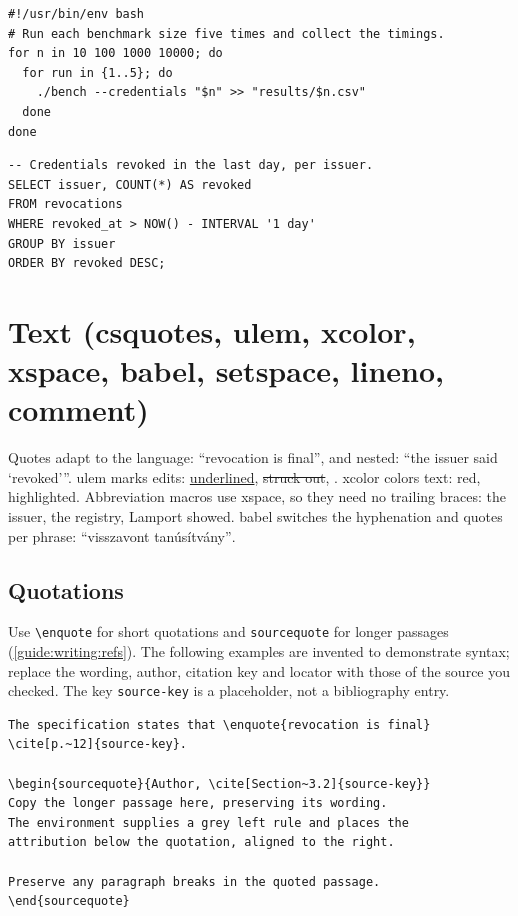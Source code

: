 \begin{listing}[!ht]
\begin{verbatim}
#!/usr/bin/env bash
# Run each benchmark size five times and collect the timings.
for n in 10 100 1000 10000; do
  for run in {1..5}; do
    ./bench --credentials "$n" >> "results/$n.csv"
  done
done
\end{verbatim}
\caption{Bash.}\label{guide:lst:latex:bash}
\end{listing}

\begin{listing}[!ht]
\begin{verbatim}
-- Credentials revoked in the last day, per issuer.
SELECT issuer, COUNT(*) AS revoked
FROM revocations
WHERE revoked_at > NOW() - INTERVAL '1 day'
GROUP BY issuer
ORDER BY revoked DESC;
\end{verbatim}
\caption{SQL.}\label{guide:lst:latex:sql}
\end{listing}
\FloatBarrier

\section{Text (csquotes, ulem, xcolor, xspace, babel, setspace, lineno, comment)}\label{guide:latex:text}
Quotes adapt to the language: \enquote{revocation is final}, and nested: \enquote{the issuer said \enquote{revoked}}.
ulem marks edits: \uline{underlined}, \sout{struck out}, . xcolor colors text: \textcolor{red!70!black}{red}, \colorbox{yellow!40}{highlighted}.
Abbreviation macros use xspace, so they need no trailing braces: \eg the issuer, \ie the registry, Lamport \etal showed.
babel switches the hyphenation and quotes per phrase: \foreignlanguage{magyar}{\enquote{visszavont tanúsítvány}}.

\subsection{Quotations}\label{guide:latex:quotations}
Use \texttt{\textbackslash enquote} for short quotations and \texttt{sourcequote} for longer passages (\cref{guide:writing:refs}). The following examples are invented to demonstrate syntax; replace the wording, author, citation key and locator with those of the source you checked. The key \texttt{source-key} is a placeholder, not a bibliography entry.

\begin{verbatim}
The specification states that \enquote{revocation is final}
\cite[p.~12]{source-key}.

\begin{sourcequote}{Author, \cite[Section~3.2]{source-key}}
Copy the longer passage here, preserving its wording.
The environment supplies a grey left rule and places the
attribution below the quotation, aligned to the right.

Preserve any paragraph breaks in the quoted passage.
\end{sourcequote}
\end{verbatim}

